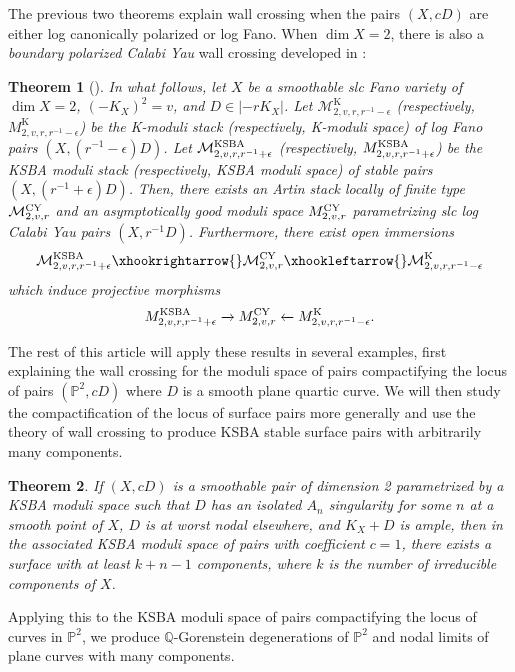 \documentclass[11pt]{amsart}
\numberwithin{equation}{section}
\newtheorem{theorem}{Theorem}[section]
\theoremstyle{definition}
\newcommand{\bQ}{\mathbb{Q}}
\newcommand{\KSBA}{{\rm KSBA}}
\newcommand{\bP}{\mathbb{P}}
\newcommand{\cM}{\mathcal M}
\newcommand{\K}{\mathrm{K}}
\begin{document}
The previous two theorems explain wall crossing when the pairs $(X,cD)$ are either log canonically polarized or log Fano.  When $\dim X = 2$, there is also a \textit{boundary polarized Calabi Yau} wall crossing developed in \cite{BABWILD, BL}: 

\begin{theorem}[\cite{BABWILD, BL}]\label{thm:introbpcywallcrossing}
In what follows, let $X$ be a smoothable slc Fano variety of $\dim X = 2$, $(-K_X)^2= v$, and $D \in |-rK_X|$. 
Let $\cM^\K_{2,v,r,r^{-1} - \epsilon}$ (respectively, $M^\K_{2,v,r,r^{-1} - \epsilon}$) be the K-moduli stack (respectively, K-moduli space) of log Fano pairs $(X,(r^{-1} - \epsilon)D)$.  Let $\cM^\KSBA_{2,v,r,r^{-1} + \epsilon}$ (respectively, $M^\KSBA_{2,v,r,r^{-1} + \epsilon}$) be the KSBA moduli stack (respectively, KSBA moduli space) of stable pairs $(X,(r^{-1} + \epsilon)D)$.  Then, there exists an Artin stack locally of finite type $\cM^{\rm CY}_{2,v,r}$ and an asymptotically good moduli space $M^{\rm CY}_{2,v,r}$ parametrizing slc log Calabi Yau pairs $(X,r^{-1}D)$.  Furthermore, there exist open immersions
 \[
 \cM^\KSBA_{2,v,r,r^{-1}+\epsilon}\xhookrightarrow{}
 \cM^{\rm CY}_{2,v,r}\xhookleftarrow{}\cM^\K_{2,v,r,r^{-1}-\epsilon}
 \]
 which induce projective morphisms
  \[
 M^\KSBA_{2,v,r,r^{-1}+\epsilon}\xrightarrow{}
 M^{\rm CY}_{2,v,r}\xleftarrow{}M^\K_{2,v,r,r^{-1}-\epsilon}.
 \]
\end{theorem}

The rest of this article will apply these results in several examples, first explaining the wall crossing for the moduli space of pairs compactifying the locus of pairs $(\bP^2, cD)$ where $D$ is a smooth plane quartic curve.   We will then study the compactification of the locus of surface pairs more generally and use the theory of wall crossing to produce KSBA stable surface pairs with arbitrarily many components.  

\begin{theorem}\label{introthm:manycomps}
    If $(X,cD)$ is a smoothable pair of dimension 2 parametrized by a KSBA moduli space such that $D$ has an isolated $A_n$ singularity for some $n$ at a smooth point of $X$, $D$ is at worst nodal elsewhere, and $K_X + D$ is ample, then in the associated KSBA moduli space of pairs with coefficient $c = 1$, there exists a surface with at least $k+n-1$ components, where $k$ is the number of irreducible components of $X$.
\end{theorem}

Applying this to the KSBA moduli space of pairs compactifying the locus of curves in $\bP^2$, we produce $\bQ$-Gorenstein degenerations of $\bP^2$ and nodal limits of plane curves with many components.  
\end{document}

